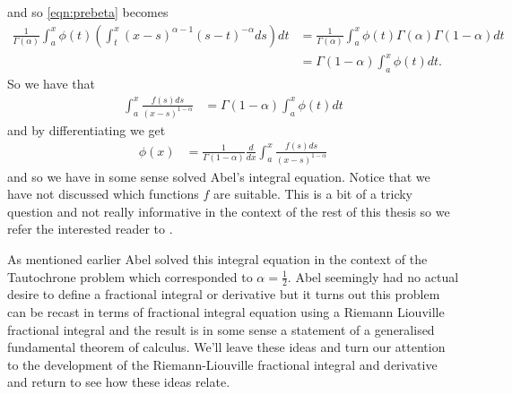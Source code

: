 and so \eqref{eqn:prebeta} becomes
\begin{align}
	\frac{1}{\Gamma(\alpha)} \int_a^x \phi(t) \left( \int_t^x (x-s)^{\alpha-1}(s-t)^{-\alpha} ds\right) dt
		&= \frac{1}{\Gamma(\alpha)} \int_a^x \phi(t) \Gamma(\alpha)\Gamma(1-\alpha) dt \\
		&= \Gamma(1-\alpha)\int_a^x \phi(t) dt. 
\end{align}
So we have that 
\begin{align}
	\int_a^x \frac{f(s)ds}{(x-s)^{1-\alpha}} &= \Gamma(1-\alpha)\int_a^x \phi(t) dt
\end{align}
and by differentiating we get
\begin{align}
	\phi(x) &= \frac{1}{\Gamma(1-\alpha)} \frac{d}{dx} \int_a^x \frac{f(s)ds}{(x-s)^{1-\alpha}}
\end{align}
and so we have in some sense solved Abel's integral equation. Notice that we have not discussed which functions $ f $ are suitable. This is a bit of a tricky question and not really informative in the context of the rest of this thesis so we refer the interested reader to \cite{Samko1993}. 

As mentioned earlier Abel solved this integral equation in the context of the Tautochrone problem which corresponded to $ \alpha = \frac{1}{2} $. Abel seemingly had no actual desire to define a fractional integral or derivative but it turns out this problem can be recast in terms of fractional integral equation using a Riemann Liouville fractional integral and the result is in some sense a statement of a generalised fundamental theorem of calculus. We'll leave these ideas and turn our attention to the development of the Riemann-Liouville fractional integral and derivative and return to see how these ideas relate.


\clearpage
